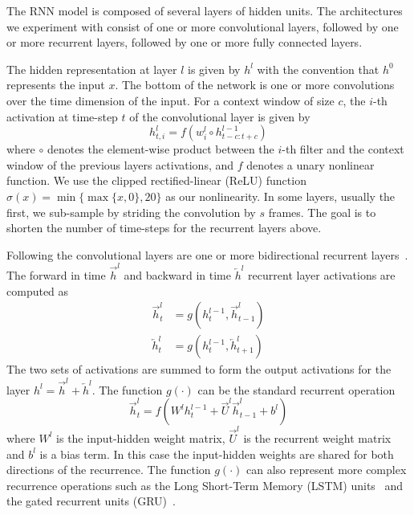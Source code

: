 \documentclass{article}
\begin{document}
The RNN model is composed of several layers of hidden units. The architectures we experiment with consist of one or more convolutional layers, followed by one or more recurrent layers, followed by one or more fully connected layers.

The hidden representation at layer $l$ is given by $h^l$ with the convention that $h^0$ represents the input $x$. The bottom of the network is one or more convolutions over the time dimension of the input. For a context window of size $c$, the $i$-th activation at time-step $t$ of the convolutional layer is given by
\begin{equation}
h_{t,i}^l = f( w_i^l \circ h^{l-1}_{t-c:t+c} )
\end{equation}
where $\circ$ denotes the element-wise product between the $i$-th filter and the context window of the previous layers activations, and $f$ denotes a unary nonlinear function. We use the clipped rectified-linear (ReLU) function $\sigma(x) = \min\{\max\{x, 0\},20\}$ as our nonlinearity. In some layers, usually the first, we sub-sample by striding the convolution by $s$ frames. The goal is to shorten the number of time-steps for the recurrent layers above.

Following the convolutional layers are one or more bidirectional recurrent layers~\cite{schuster1997bidirectional}. The forward in time $\overrightarrow{h}^l$ and backward in time $\overleftarrow{h}^l$ recurrent layer activations are computed as
\begin{equation}
\begin{aligned}
    \overrightarrow{h}_t^l &= g( h_t^{l-1}, \overrightarrow{h}_{t-1}^l ) \\
    \overleftarrow{h}_t^l &= g( h_t^{l-1}, \overleftarrow{h}_{t+1}^l )
\end{aligned}
\end{equation}
The two sets of activations are summed to form the output activations for the layer $h^l = \overrightarrow{h}^l + \overleftarrow{h}^l$.
The function $g(\cdot)$ can be the standard recurrent operation
\begin{equation}
\label{eq:plainrnn}
    \overrightarrow{h}_t^l = f( W^l h_t^{l-1} + \overrightarrow{U}^l \overrightarrow{h}_{t-1}^l + b^l )
\end{equation}
where $W^l$ is the input-hidden weight matrix, $\overrightarrow{U}^l$ is the recurrent weight matrix and $b^l$ is a bias term. In this case the input-hidden weights are shared for both directions of the recurrence. The function $g(\cdot)$ can also represent more complex recurrence operations such as the Long Short-Term Memory (LSTM) units~\cite{hochreiter1997lstm} and the gated recurrent units (GRU)~\cite{cho2014}.
\end{document}
